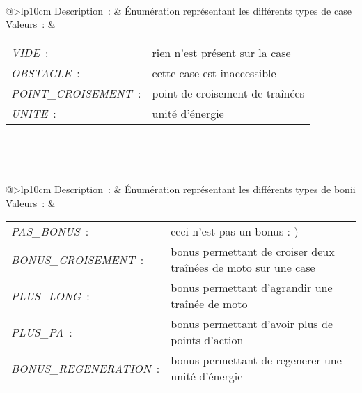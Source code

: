  \\
\noindent
\begin{tabular}[t]{@{\extracolsep{0pt}}>{\bfseries}lp{10cm}}
Description~: & Énumération représentant les différents types de case \\
Valeurs~: &
\small
\begin{tabular}[t]{@{\extracolsep{0pt}}lp{7cm}}
    
        \textsl{VIDE}~: & rien n'est présent sur la case \\
    
        \textsl{OBSTACLE}~: & cette case est inaccessible \\
    
        \textsl{POINT\_CROISEMENT}~: & point de croisement de traînées \\
    
        \textsl{UNITE}~: & unité d'énergie \\
    
\end{tabular} \\
\end{tabular}



 \\
\noindent
\begin{tabular}[t]{@{\extracolsep{0pt}}>{\bfseries}lp{10cm}}
Description~: & Énumération représentant les différents types de bonii \\
Valeurs~: &
\small
\begin{tabular}[t]{@{\extracolsep{0pt}}lp{7cm}}
    
        \textsl{PAS\_BONUS}~: & ceci n'est pas un bonus :-) \\
    
        \textsl{BONUS\_CROISEMENT}~: & bonus permettant de croiser deux traînées de moto sur une case \\
    
        \textsl{PLUS\_LONG}~: & bonus permettant d'agrandir une traînée de moto \\
    
        \textsl{PLUS\_PA}~: & bonus permettant d'avoir plus de points d'action \\
    
        \textsl{BONUS\_REGENERATION}~: & bonus permettant de regenerer une unité d'énergie \\
    
\end{tabular} \\
\end{tabular}



